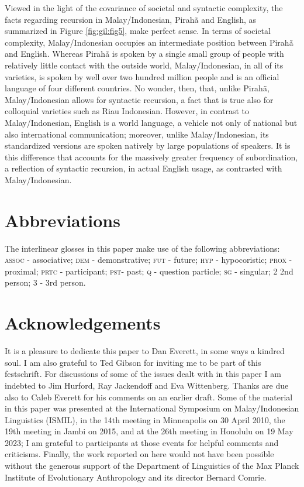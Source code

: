 \documentclass[output=paper,colorlinks,citecolor=brown
]{langscibook}
\begin{document}
Viewed in the light of the covariance of societal and syntactic complexity, the facts regarding recursion in Malay/Indonesian, Pirahã and English, as summarized in Figure \ref{fig:gil:fig5}, make perfect sense.  In terms of societal complexity, Malay/Indonesian occupies an intermediate position between Pirahã and English.  Whereas Pirahã is spoken by a single small group of people with relatively little contact with the outside world, Malay/Indonesian, in all of its varieties, is spoken by well over two hundred million people and is an official language of four different countries.  No wonder, then, that, unlike Pirahã, Malay/Indonesian allows for syntactic recursion, a fact that is true also for colloquial varieties such as Riau Indonesian.  However, in contrast to Malay/Indonesian, English is a world language, a vehicle not only of national but also international communication; moreover, unlike Malay/Indonesian, its standardized versions are spoken natively by large populations of speakers.  It is this difference that accounts for the massively greater frequency of subordination, a reflection of syntactic recursion, in actual English usage, as contrasted with Malay/Indonesian.

\section*{Abbreviations}
The interlinear glosses in this paper make use of the following abbreviations: \textsc{assoc} - associative; \textsc{dem} - demonstrative; \textsc{fut} - future; \textsc{hyp} - hypocoristic; \textsc{prox} - proximal; \textsc{prtc} - participant; \textsc{pst}- past; \textsc{q} - question particle; \textsc{sg} - singular; 2   2nd person; 3 - 3rd person.

\section*{Acknowledgements}
It is a pleasure to dedicate this paper to Dan Everett, in some ways a kindred soul.  I am also grateful to Ted Gibson for inviting me to be part of this festschrift.  For discussions of some of the issues dealt with in this paper I am indebted to Jim Hurford, Ray Jackendoff and Eva Wittenberg.  Thanks are due also to Caleb Everett for his comments on an earlier draft.  Some of the material in this paper was presented at the International Symposium on Malay/Indonesian Linguistics (ISMIL), in the 14th meeting in Minneapolis on 30 April 2010, the 19th meeting in Jambi on 2015, and at the 26th meeting in Honolulu on 19 May 2023; I am grateful to participants at those events for helpful comments and criticisms.  Finally, the work reported on here would not have been possible without the generous support of the Department of Linguistics of the Max Planck Institute of Evolutionary Anthropology and its director Bernard Comrie.

\printbibliography[heading=subbibliography,notkeyword=this]
\end{document}
